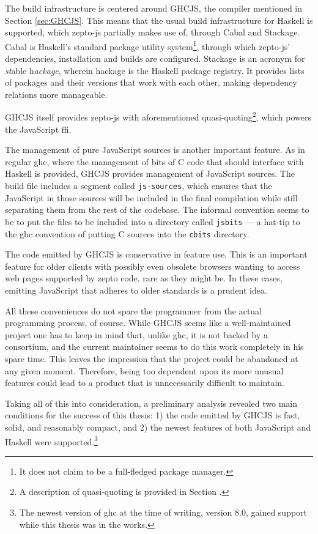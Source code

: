 \documentclass[oneside,11pt,xetex]{scrbook}
\begin{document}
The build infrastructure is centered around GHCJS, the compiler mentioned in Section \ref{sec:GHCJS}.
This means that the usual build infrastructure for Haskell is supported, which zepto-js partially
makes use of, through Cabal and Stackage. Cabal is Haskell's standard package utility
system\footnote{It does not claim to be a full-fledged package manager.}, through which
zepto-js' dependencies, installation and builds are configured. Stackage is an acronym
for \textit{st}able h\textit{ackage}, wherein hackage is the Haskell package registry.
It provides lists of packages and their versions that work with each other, making
dependency relations more manageable.

GHCJS itself provides zepto-js with aforementioned quasi-quoting\footnote{A description
of quasi-quoting is provided in Section \label{ququ}.}, which powers the JavaScript \gls{ffi}.

The management of pure JavaScript sources is another important feature. As in regular \gls{ghc},
where the management of bits of C code that should interface with Haskell is provided, GHCJS
provides management of JavaScript sources. The build file includes a segment called
\texttt{js-sources}, which ensures that the JavaScript in those sources will be included in the
final compilation while still separating them from the rest of the codebase. The informal convention
seems to be to put the files to be included into a directory called \texttt{jsbits} --- a hat-tip
to the \gls{ghc} convention of putting C sources into the \texttt{cbits} directory.

The code emitted by GHCJS is conservative in feature use. This is an important feature for
older clients with possibly even obsolete browsers wanting to access web pages supported by
zepto code, rare as they might be. In these cases, emitting JavaScript that adheres to older
standards is a prudent idea.

All these conveniences do not spare the programmer from the actual programming process, of course.
While GHCJS seems like a well-maintained project one has to keep in mind that, unlike \gls{ghc},
it is not backed by a consortium, and the current maintainer seems to do this work completely
in his spare time. This leaves the impression that the project could be abandoned at any given
moment. Therefore, being too dependent upon its more unusual features could lead to a product that
is unnecessarily difficult to maintain.

Taking all of this into consideration, a preliminary analysis revealed two main conditions for
the success of this thesis: 1) the code emitted by GHCJS is fast, solid, and reasonably compact,
and 2) the newest features of both JavaScript and Haskell were supported.\footnote{The newest version
of \gls{ghc} at the time of writing, version 8.0, gained support while this thesis was in the works.}
\end{document}
